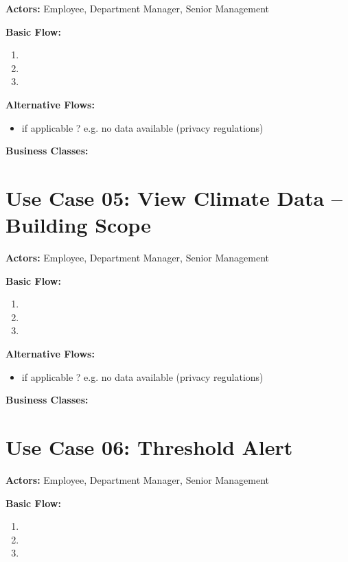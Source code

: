 \documentclass{article}
\begin{document}
\textbf{Actors:} Employee, Department Manager, Senior Management 

\textbf{Basic Flow:}
\begin{enumerate}
    \item
    \item
    \item 
\end{enumerate}

\textbf{Alternative Flows:}
\begin{itemize}
    \item if applicable ? e.g. no data available (privacy regulations)
\end{itemize}

\textbf{Business Classes:}
\vspace{1em}

\section*{Use Case 05: View Climate Data -- Building Scope}

\textbf{Actors:} Employee, Department Manager, Senior Management 

\textbf{Basic Flow:}
\begin{enumerate}
    \item
    \item
    \item 
\end{enumerate}

\textbf{Alternative Flows:}
\begin{itemize}
    \item if applicable ? e.g. no data available (privacy regulations)
\end{itemize}

\textbf{Business Classes:}
\vspace{1em}


\section*{Use Case 06: Threshold Alert}

\textbf{Actors:} Employee, Department Manager, Senior Management 

\textbf{Basic Flow:}
\begin{enumerate}
    \item
    \item
    \item 
\end{enumerate}
\end{document}
